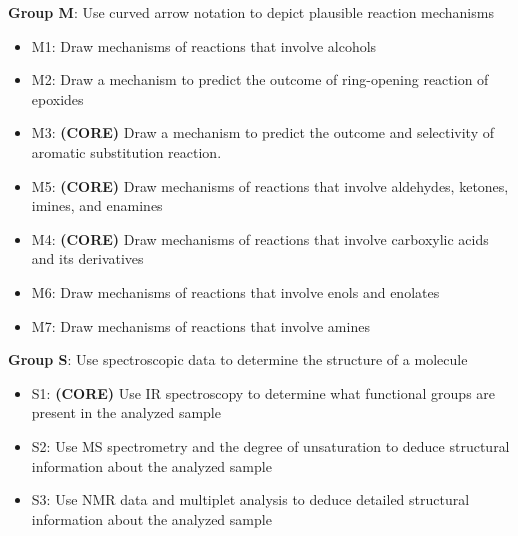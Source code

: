 \textbf{Group M}: Use curved arrow notation to depict plausible reaction
mechanisms

\begin{itemize}
\tightlist
\item
  M1: Draw mechanisms of reactions that involve alcohols
\item
  M2: Draw a mechanism to predict the outcome of ring-opening reaction
  of epoxides
\item
  M3: \textbf{(CORE)} Draw a mechanism to predict the outcome and
  selectivity of aromatic substitution reaction.
\item
  M5: \textbf{(CORE)} Draw mechanisms of reactions that involve
  aldehydes, ketones, imines, and enamines
\item
  M4: \textbf{(CORE)} Draw mechanisms of reactions that involve
  carboxylic acids and its derivatives
\item
  M6: Draw mechanisms of reactions that involve enols and enolates
\item
  M7: Draw mechanisms of reactions that involve amines
\end{itemize}

\textbf{Group S}: Use spectroscopic data to determine the structure of a
molecule

\begin{itemize}
\tightlist
\item
  S1: \textbf{(CORE)} Use IR spectroscopy to determine what functional
  groups are present in the analyzed sample
\item
  S2: Use MS spectrometry and the degree of unsaturation to deduce
  structural information about the analyzed sample
\item
  S3: Use NMR data and multiplet analysis to deduce detailed structural
  information about the analyzed sample
\end{itemize}
